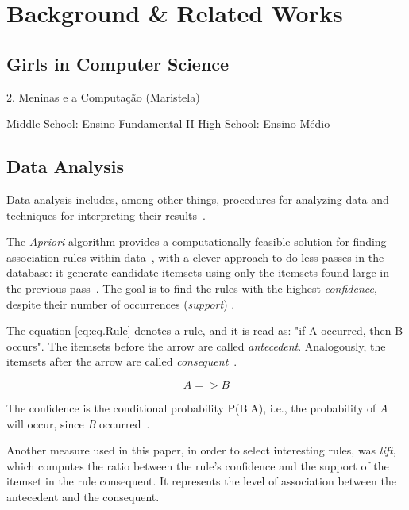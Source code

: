 \section{Background \& Related Works}\label{sec:background}%

\subsection{Girls in Computer Science}\label{subsec:background:girls}%
2. Meninas e a Computação (Maristela)

Middle School: Ensino Fundamental II
High School: Ensino Médio


\subsection{Data Analysis}\label{subsec:background:data}%

Data analysis includes, among other things, procedures for analyzing data and techniques for interpreting their results~\cite{Tukey1962}.

The \emph{Apriori} algorithm provides a computationally feasible solution for finding association rules within data~\cite{Hastie2009}, with a clever approach to do less passes in the database: it generate candidate itemsets using only the itemsets found large in the previous pass~\cite{Agrawal1994}. The goal is to find the rules with the highest \emph{confidence}, despite their number of occurrences (\emph{support}) \cite{taniar_exception_2008}. 

The equation \ref{eq:eq.Rule} denotes a rule, and it is read as: "if A occurred, then B occurs". The itemsets before the arrow are called \emph{antecedent}. Analogously, the itemsets after the arrow are called \emph{consequent}~\cite{Hastie2009}.

\begin{equation}
{A} => {B}
\label{eq:eq.Rule}%
\end{equation}

The confidence is the conditional probability P(B|A), i.e., the probability of \emph{A} will occur, since \emph{B} occurred~\cite{Hastie2009}.

Another measure used in this paper, in order to select interesting rules, was \emph{lift}, which computes the ratio between the rule's confidence and the support of the itemset in the rule consequent. It represents the level of association between the antecedent and the consequent.~\cite{tan2006introduction}

